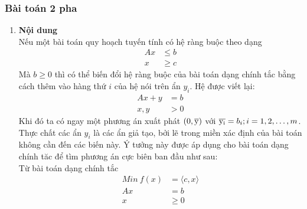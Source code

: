 \documentclass{article}
\begin{document}
            \subsubsection{Bài toán 2 pha}
                \begin{enumerate}
                    \item \textbf{Nội dung} \\
                        Nếu một bài toán quy hoạch tuyến tính có hệ ràng buộc theo dạng
                            \begin{equation}
                                \begin{split}
                                    Ax &\leq b \\
                                    x &\geq c
                                \end{split}
                            \end{equation}
                        Mà $b \geq 0$ thì có thể biến đổi hệ ràng buộc của bài toán dạng chính tắc bằng cách thêm vào hàng thứ $i$ của hệ nói trên ẩn $y_i$. Hệ được viết lại:
                            \begin{equation}
                                \begin{split}
                                    Ax+y&=b\\
                                    x,y &> 0
                                \end{split}
                            \end{equation}
                        Khi đó ta có ngay một phương án xuất phát $(0,\overline{\rm y})$ với $\overline{\rm y_i} = b_i ; i=1,2,\ldots,m$. \\
                        Thực chất các ẩn $y_i$ là các ẩn giả tạo, bởi lẽ trong miền xác định của bài toán không cần đến các biến này. Ý tưởng này được áp dụng cho bài toán dạng chính tăc để tìm phương án cực biên ban đầu như sau: \\
                        Từ bài toán dạng chính tắc
                            \begin{equation} \label{2.1}
                                \begin{split}
                                    Min \: f(x) &= \langle c,x \rangle \\
                                    Ax &= b \\
                                    x &\geq 0
                                \end{split}

\end{equation}
\end{enumerate}
\end{document}
